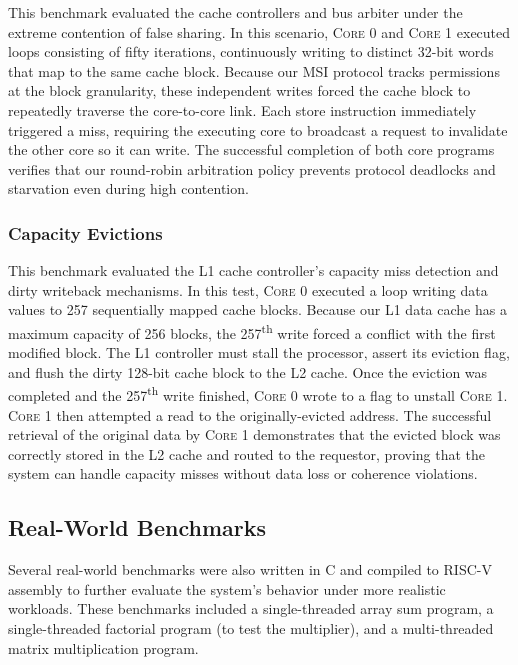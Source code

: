 \documentclass[10pt, compsoc]{IEEEtran}
\begin{document}
This benchmark evaluated the cache controllers and bus arbiter under the extreme contention of false sharing. In this scenario, \textsc{Core 0} and \textsc{Core 1} executed loops consisting of fifty iterations, continuously writing to distinct 32-bit words that map to the same cache block. Because our MSI protocol tracks permissions at the block granularity, these independent writes forced the cache block to repeatedly traverse the core-to-core link. Each store instruction immediately triggered a miss, requiring the executing core to broadcast a request to invalidate the other core so it can write. The successful completion of both core programs verifies that our round-robin arbitration policy prevents protocol deadlocks and starvation even during high contention.



\subsubsection*{Capacity Evictions} 

This benchmark evaluated the L1 cache controller's capacity miss detection and dirty writeback mechanisms. In this test, \textsc{Core 0} executed a loop writing data values to 257 sequentially mapped cache blocks. Because our L1 data cache has a maximum capacity of 256 blocks, the 257\textsuperscript{th} write forced a conflict with the first modified block. The L1 controller must stall the processor, assert its eviction flag, and flush the dirty 128-bit cache block to the L2 cache. Once the eviction was completed and the 257\textsuperscript{th} write finished, \textsc{Core 0} wrote to a flag to unstall \textsc{Core 1}. \textsc{Core 1} then attempted a read to the originally-evicted address. The successful retrieval of the original data by \textsc{Core 1} demonstrates that the evicted block was correctly stored in the L2 cache and routed to the requestor, proving that the system can handle capacity misses without data loss or coherence violations.





\subsection{Real-World Benchmarks}

Several real-world benchmarks were also written in C and compiled to RISC-V assembly to further evaluate the system's behavior under more realistic workloads. These benchmarks included a single-threaded array sum program, a single-threaded factorial program (to test the multiplier), and a multi-threaded matrix multiplication program. 
\end{document}
